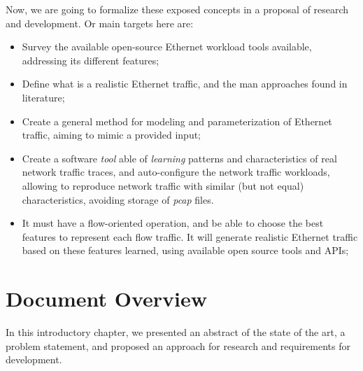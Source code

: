 Now, we are going to formalize these exposed concepts in a proposal of research and development. Or main targets here are:

\begin{itemize}


\item Survey the available open-source Ethernet workload tools available, addressing its different features;


\item Define what is a realistic Ethernet traffic, and the man approaches found in literature;


\item Create a general method for modeling and parameterization of Ethernet traffic, aiming to mimic a provided input;


\item Create a software \textit{tool} able of \textit{learning} patterns and characteristics of real network traffic traces, and auto-configure the network traffic workloads, allowing to reproduce network traffic with similar (but not equal) characteristics, avoiding storage of \textit{pcap} files. 


\item It must have a flow-oriented operation, and be able to choose the best features to represent each flow traffic. It will generate realistic Ethernet traffic based on these features learned, using available open source tools and APIs;


\end{itemize}




\section{Document Overview}


In this introductory chapter, we presented an abstract of the state of the art, a problem statement, and proposed an approach for research and requirements for development.

